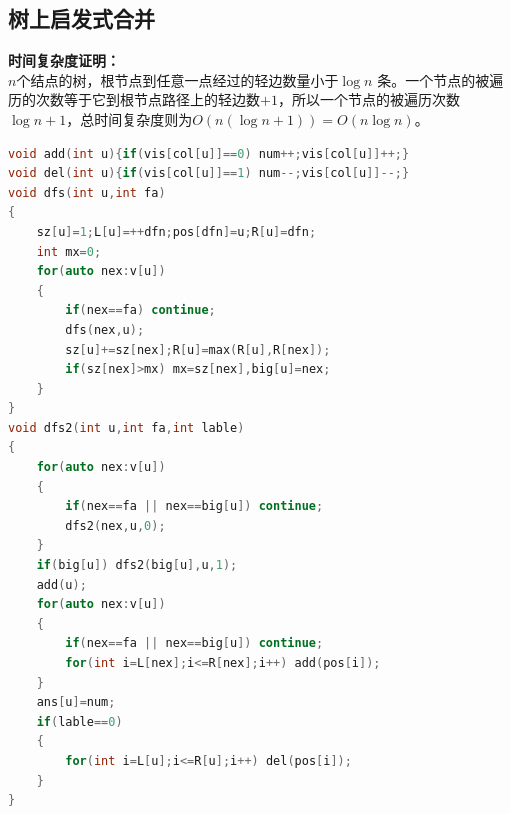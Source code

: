 \documentclass[a4paper]{book}
\begin{document}
\subsection{树上启发式合并}
\noindent\textbf{时间复杂度证明：}\\
$n$个结点的树，根节点到任意一点经过的轻边数量小于$\log n$ 条。一个节点的被遍历的次数等于它到根节点路径上的轻边数$+1$，所以一个节点的被遍历次数$\log n+1$，总时间复杂度则为$O(n(\log n+1))=O(n\log n)$。
\begin{lstlisting}[language=C++,title=树上启发式合并求子树中颜色种类]
void add(int u){if(vis[col[u]]==0) num++;vis[col[u]]++;}
void del(int u){if(vis[col[u]]==1) num--;vis[col[u]]--;}
void dfs(int u,int fa)
{
    sz[u]=1;L[u]=++dfn;pos[dfn]=u;R[u]=dfn;
    int mx=0;
    for(auto nex:v[u])
    {
        if(nex==fa) continue;
        dfs(nex,u);
        sz[u]+=sz[nex];R[u]=max(R[u],R[nex]);
        if(sz[nex]>mx) mx=sz[nex],big[u]=nex;
    }
}
void dfs2(int u,int fa,int lable)
{
    for(auto nex:v[u])
    {
        if(nex==fa || nex==big[u]) continue;
        dfs2(nex,u,0);
    }
    if(big[u]) dfs2(big[u],u,1);
    add(u);
    for(auto nex:v[u])
    {
        if(nex==fa || nex==big[u]) continue;
        for(int i=L[nex];i<=R[nex];i++) add(pos[i]);
    }
    ans[u]=num;
    if(lable==0) 
    {
        for(int i=L[u];i<=R[u];i++) del(pos[i]);
    } 
}
\end{lstlisting}
\end{document}
